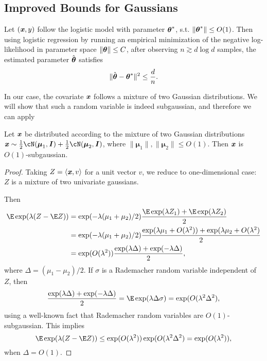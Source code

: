 \subsection{Improved Bounds for Gaussians}\label{sec:LogisticGauss}


\begin{theorem}
    \label{thm:logistic-regression-parameter-closeness}
    Let $(\boldsymbol{\mathit{x}}, y)$ follow the logistic model with parameter $\boldsymbol{\mathit{\theta}}^*$, s.t. $\|\boldsymbol{\mathit{\theta}}^*\| \leq O(1)$. Then using logistic regression by running an empirical minimization of the negative log-likelihood in parameter space $\|\boldsymbol{\mathit{\theta}}\| \leq C$, after observing $n \gtrsim d \log d$ samples, the estimated parameter $\hat{\boldsymbol{\mathit{\theta}}}$ satisfies \begin{equation*}
        \|\hat{\boldsymbol{\mathit{\theta}}} - \boldsymbol{\mathit{\theta}}^*\|^2 \leq \frac{d}{n}.
    \end{equation*}
\end{theorem}
In our case, the covariate $\boldsymbol{\mathit{x}}$ follows a mixture of two Gaussian distributions. We will show that such a random variable is indeed subgaussian, and therefore we can apply~
\begin{fact}
\label{fact:mixture-is-subgaussian}
    Let $\boldsymbol{\mathit{x}}$ be distributed according to the mixture of two Gaussian distributions $\xx \sim \frac{1}{2} \cN(\boldsymbol{\mu}_1, \II) + \frac{1}{2} \cN(\boldsymbol{\mu}_2, \II)$, where $\|\boldsymbol{\mu}_1\|, \|\boldsymbol{\mu}_2\| \leq O(1)$. Then $\boldsymbol{\mathit{x}}$ is $O(1)$-subgaussian.
\end{fact}
\begin{proof}
Taking $Z = \langle \boldsymbol{\mathit{x}}, v\rangle$ for a unit vector $v$, we reduce to one-dimensional case: $Z$ is a mixture of two univariate gaussians.

Then
\begin{align*}
    \E \exp(\lambda(Z - \E Z)) & = \exp(-\lambda(\mu_1 + \mu_2)/2) \frac{\E\exp(\lambda Z_1) + \E\exp(\lambda Z_2)}{2} \\
    & = \exp(-\lambda(\mu_1 + \mu_2)/2) \frac{\exp(\lambda \mu_1 + O(\lambda^2)) + \exp(\lambda \mu_2 + O(\lambda^2)}{2} \\
    & = \exp(O(\lambda^2)) \frac{\exp(\lambda \Delta) + \exp(-\lambda \Delta)}{2},
\end{align*}
where $\Delta = (\mu_1 - \mu_2)/2$. If $\sigma$ is a Rademacher random variable independent of $Z$, then 
\begin{equation*}
    \frac{\exp(\lambda \Delta) + \exp(-\lambda \Delta)}{2} = \E \exp(\lambda \Delta \sigma) = \exp(O(\lambda^2 \Delta^2),
\end{equation*}
using a well-known fact that Rademacher random variables are $O(1)$-subgaussian. This implies
\begin{equation*}
    \E \exp(\lambda(Z - \E Z)) \leq \exp(O(\lambda^2)) \exp(O(\lambda^2 \Delta^2) = \exp(O(\lambda^2)),
\end{equation*}
when $\Delta = O(1)$.
\end{proof}


